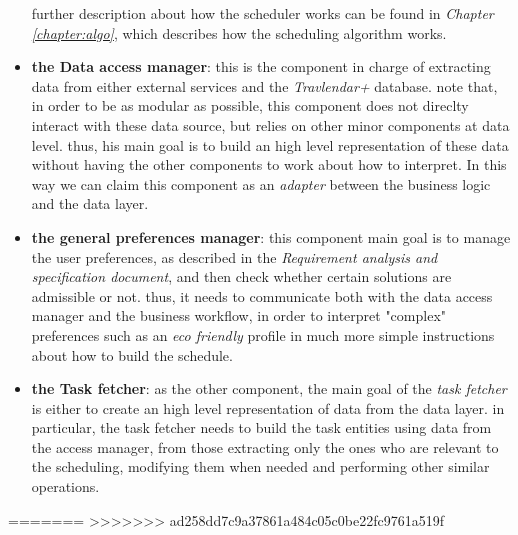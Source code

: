 \begin{itemize}
\begin{itemize}
            \end{itemize}
            
    further description about how the scheduler works can be found in \emph{Chapter \ref{chapter:algo}}, which describes how the scheduling algorithm works.
    
    \item \textbf{the Data access manager}: this is the component in charge of extracting data from either external services and the \emph{Travlendar+} database. note that, in order to be as modular as possible, this component does not direclty interact with these data source, but relies on other minor components at data level. thus, his main goal is to build an high level representation of these data without having the other components to work about how to interpret. In this way we can claim this component as an \emph{adapter} between the business logic and the data layer.
    
    \item \textbf{the general preferences manager}: this component main goal is to manage the user preferences, as described in the \emph{Requirement analysis and specification document}, and then check whether certain solutions are admissible or not. thus, it needs to communicate both with the data access manager and the business workflow, in order to interpret "complex" preferences such as an \emph{eco friendly} profile in much more simple instructions about how to build the  
    schedule.
    
    \item \textbf{the Task fetcher}: as the other component, the main goal of the \emph{task fetcher} is either to create an high level representation of data from the data layer. in particular, the task fetcher needs to build the task entities using data from the access manager, from those extracting only the ones who are relevant to the scheduling, modifying them when needed and performing other similar operations.
\end{itemize}
=======
>>>>>>> ad258dd7c9a37861a484c05c0be22fc9761a519f

